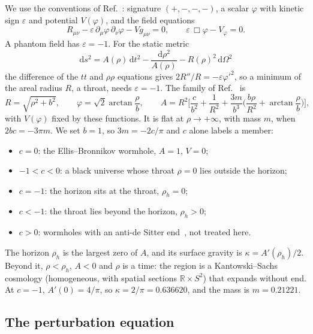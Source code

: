 \documentclass[11pt]{article}
\theoremstyle{plain}
\newcommand{\dd}{\mathrm{d}}
\newcommand{\eps}{\varepsilon}
\begin{document}
We use the conventions of Ref.~\cite{BF06}: signature $(+,-,-,-)$, a scalar $\varphi$ with kinetic sign $\eps$ and potential
$V(\varphi)$, and the field equations
\begin{equation}
R_{\mu\nu}-\eps\,\partial_\mu\varphi\,\partial_\nu\varphi-V g_{\mu\nu}=0,\qquad \eps\,\Box\varphi-V_\varphi=0 .
\end{equation}
A phantom field has $\eps=-1$. For the static metric
\begin{equation}
\dd s^2=A(\rho)\,\dd t^2-\frac{\dd\rho^2}{A(\rho)}-R(\rho)^2\,\dd\Omega^2
\end{equation}
the difference of the $tt$ and $\rho\rho$ equations gives $2R''/R=-\eps\varphi'^2$, so a minimum of the areal radius $R$, a throat, needs
$\eps=-1$. The family of Ref.~\cite{BF06} is
\begin{equation}
R=\sqrt{\rho^2+b^2},\qquad \varphi=\sqrt2\arctan\frac\rho b,\qquad
A=R^2\Big[\frac{c}{b^2}+\frac1{R^2}+\frac{3m}{b^3}\Big(\frac{b\rho}{R^2}+\arctan\frac\rho b\Big)\Big],\label{eq:family}
\end{equation}
with $V(\varphi)$ fixed by these functions. It is flat at $\rho\to+\infty$, with mass $m$, when $2bc=-3\pi m$. We set $b=1$,
so $3m=-2c/\pi$ and $c$ alone labels a member:
\begin{itemize}
\item $c=0$: the Ellis--Bronnikov wormhole, $A=1$, $V=0$;
\item $-1<c<0$: a black universe whose throat $\rho=0$ lies outside the horizon;
\item $c=-1$: the horizon sits at the throat, $\rho_h=0$;
\item $c<-1$: the throat lies beyond the horizon, $\rho_h>0$;
\item $c>0$: wormholes with an anti-de Sitter end~\cite{BKZ12}, not treated here.
\end{itemize}
The horizon $\rho_h$ is the largest zero of $A$, and its surface gravity is $\kappa=A'(\rho_h)/2$. Beyond it, $\rho<\rho_h$,
$A<0$ and $\rho$ is a time: the region is a Kantowski--Sachs cosmology (homogeneous, with spatial sections
$\mathbb R\times S^2$) that expands without end. At $c=-1$, $A'(0)=4/\pi$, so $\kappa=2/\pi=0.636620$, and the mass is
$m=0.21221$.

\subsection{The perturbation equation}
\end{document}
